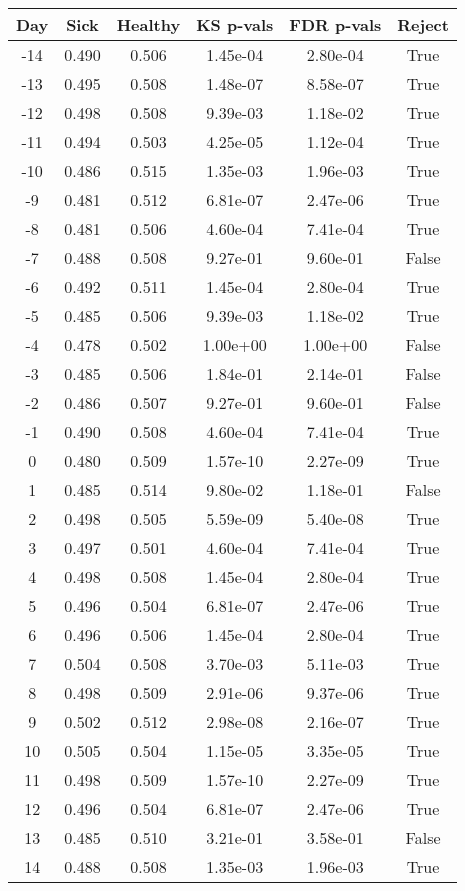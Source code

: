 \begin{tabular}{c|c|c|c|c|c}
Day &  Sick & Healthy &  KS p-vals & FDR p-vals & Reject\\
\hline
-14 & 0.490 &   0.506 &   1.45e-04 &   2.80e-04 &   True\\
-13 & 0.495 &   0.508 &   1.48e-07 &   8.58e-07 &   True\\
-12 & 0.498 &   0.508 &   9.39e-03 &   1.18e-02 &   True\\
-11 & 0.494 &   0.503 &   4.25e-05 &   1.12e-04 &   True\\
-10 & 0.486 &   0.515 &   1.35e-03 &   1.96e-03 &   True\\
 -9 & 0.481 &   0.512 &   6.81e-07 &   2.47e-06 &   True\\
 -8 & 0.481 &   0.506 &   4.60e-04 &   7.41e-04 &   True\\
 -7 & 0.488 &   0.508 &   9.27e-01 &   9.60e-01 &  False\\
 -6 & 0.492 &   0.511 &   1.45e-04 &   2.80e-04 &   True\\
 -5 & 0.485 &   0.506 &   9.39e-03 &   1.18e-02 &   True\\
 -4 & 0.478 &   0.502 &   1.00e+00 &   1.00e+00 &  False\\
 -3 & 0.485 &   0.506 &   1.84e-01 &   2.14e-01 &  False\\
 -2 & 0.486 &   0.507 &   9.27e-01 &   9.60e-01 &  False\\
 -1 & 0.490 &   0.508 &   4.60e-04 &   7.41e-04 &   True\\
  0 & 0.480 &   0.509 &   1.57e-10 &   2.27e-09 &   True\\
  1 & 0.485 &   0.514 &   9.80e-02 &   1.18e-01 &  False\\
  2 & 0.498 &   0.505 &   5.59e-09 &   5.40e-08 &   True\\
  3 & 0.497 &   0.501 &   4.60e-04 &   7.41e-04 &   True\\
  4 & 0.498 &   0.508 &   1.45e-04 &   2.80e-04 &   True\\
  5 & 0.496 &   0.504 &   6.81e-07 &   2.47e-06 &   True\\
  6 & 0.496 &   0.506 &   1.45e-04 &   2.80e-04 &   True\\
  7 & 0.504 &   0.508 &   3.70e-03 &   5.11e-03 &   True\\
  8 & 0.498 &   0.509 &   2.91e-06 &   9.37e-06 &   True\\
  9 & 0.502 &   0.512 &   2.98e-08 &   2.16e-07 &   True\\
 10 & 0.505 &   0.504 &   1.15e-05 &   3.35e-05 &   True\\
 11 & 0.498 &   0.509 &   1.57e-10 &   2.27e-09 &   True\\
 12 & 0.496 &   0.504 &   6.81e-07 &   2.47e-06 &   True\\
 13 & 0.485 &   0.510 &   3.21e-01 &   3.58e-01 &  False\\
 14 & 0.488 &   0.508 &   1.35e-03 &   1.96e-03 &   True\\
\end{tabular}